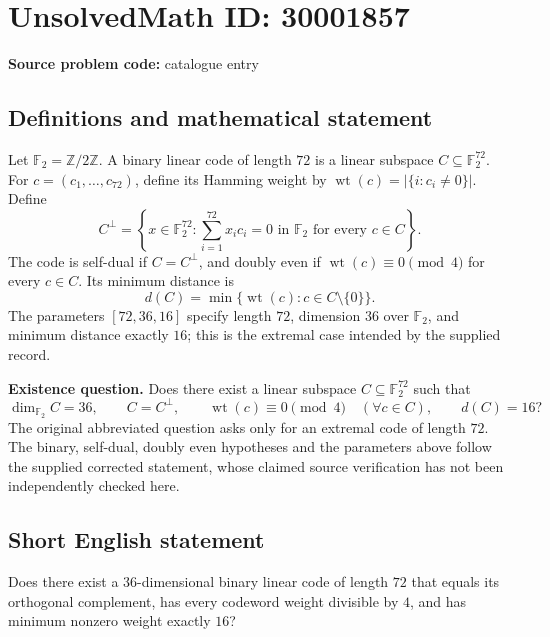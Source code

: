 \documentclass[11pt]{article}
\newcommand{\Z}{\mathbb{Z}}
\newcommand{\F}{\mathbb{F}}
\begin{document}
\section*{UnsolvedMath ID: 30001857}
\textbf{Source problem code:} catalogue entry
\subsection{Definitions and mathematical statement}
Let $\F_2=\Z/2\Z$. A binary linear code of length $72$ is a linear subspace $C\subseteq\F_2^{72}$. For $c=(c_1,\ldots,c_{72})$, define its Hamming weight by $\operatorname{wt}(c)=|\{i:c_i\ne0\}|$. Define
\[
C^\perp=\left\{x\in\F_2^{72}:\sum_{i=1}^{72}x_ic_i=0\text{ in }\F_2\text{ for every }c\in C\right\}.
\]
The code is self-dual if $C=C^\perp$, and doubly even if $\operatorname{wt}(c)\equiv0\pmod4$ for every $c\in C$. Its minimum distance is
\[
d(C)=\min\{\operatorname{wt}(c):c\in C\setminus\{0\}\}.
\]
The parameters $[72,36,16]$ specify length $72$, dimension $36$ over $\F_2$, and minimum distance exactly $16$; this is the extremal case intended by the supplied record.

\textbf{Existence question.} Does there exist a linear subspace $C\subseteq\F_2^{72}$ such that
\[
\dim_{\F_2}C=36,\qquad C=C^\perp,\qquad
\operatorname{wt}(c)\equiv0\pmod4\quad(\forall c\in C),\qquad d(C)=16?
\]
The original abbreviated question asks only for an extremal code of length $72$. The binary, self-dual, doubly even hypotheses and the parameters above follow the supplied corrected statement, whose claimed source verification has not been independently checked here.
\subsection{Short English statement}
Does there exist a $36$-dimensional binary linear code of length $72$ that equals its orthogonal complement, has every codeword weight divisible by $4$, and has minimum nonzero weight exactly $16$?
\end{document}
